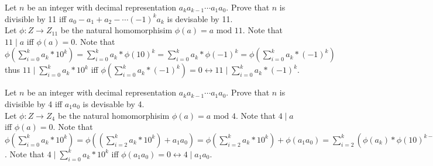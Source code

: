 \documentclass[12pt]{article}
\makeatletter
\theoremstyle{homework}
\newenvironment{exercise}[1]
{\def\@currentlabel{#1}\exercisecore}
{\endexercisecore}
\makeatother
\begin{document}
\begin{exercise}{15.32}
Let $n$ be an integer with decimal representation $a_ka_{k-1}\cdots a_1a_0$.  Prove that $n$ is divisible by 11 iff $a_0-a_1+a_2-\cdots (-1)^ka_k$ is devisable by 11.\\
Let $\phi :Z\rightarrow Z_{11}$ be the natural homomorphisim $\phi(a)=a\text{ mod }11$.  Note that $11\mid a$ iff $\phi(a)=0$.  Note that $\phi(\sum_{i=0}^{k} a_k*10^k)=\sum_{i=0}^{k} a_k*\phi(10)^k=\sum_{i=0}^{k} a_k*\phi(-1)^k=\phi(\sum_{i=0}^{k} a_k*(-1)^k)$ thus $11\mid \sum_{i=0}^{k} a_k*10^k$ iff $\phi(\sum_{i=0}^{k} a_k*(-1)^k)=0\longleftrightarrow 11\mid \sum_{i=0}^{k} a_k*(-1)^k$.
\end{exercise}

\begin{exercise}{15.36}
Let $n$ be an integer with decimal representation $a_ka_{k-1}\cdots a_1a_0$.  Prove that $n$ is divisible by 4 iff $a_1a_0$ is devisable by 4.\\
Let $\phi :Z\rightarrow Z_{4}$ be the natural homomorphisim $\phi(a)=a\text{ mod }4$.  Note that $4\mid a$ iff $\phi(a)=0$.  Note that $\phi(\sum_{i=0}^{k} a_k*10^k)=\phi((\sum_{i=2}^{k} a_k*10^k)+a_1a_0)=\phi(\sum_{i=2}^{k} a_k*10^k)+\phi(a_1a_0)=\sum_{i=2}^{k} (\phi(a_k)*\phi(10)^{k-2}*\phi(100))+\phi(a_1a_0)=\sum_{i=2}^{k} (\phi(a_k)*\phi(10)^{k-2}*0)+\phi(a_1a_0)=\phi(a_1a_0)$.  Note that $4\mid \sum_{i=0}^{k} a_k*10^k$ iff $\phi(a_1a_0)=0\longleftrightarrow 4\mid a_1a_0$.
\end{exercise}
\end{document}
